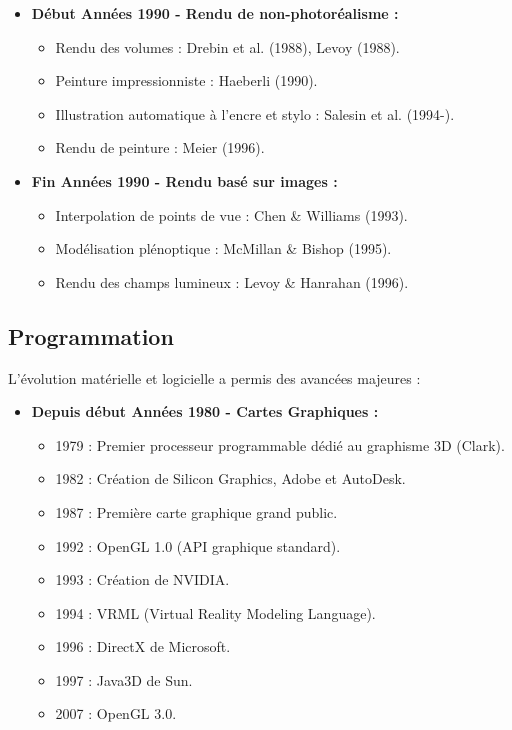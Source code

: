 \documentclass{article}
\begin{document}
\begin{itemize}
    \item \textbf{Début Années 1990 - Rendu de non-photoréalisme :}
    \begin{itemize}
        \item Rendu des volumes : Drebin et al. (1988), Levoy (1988).
        \item Peinture impressionniste : Haeberli (1990).
        \item Illustration automatique à l'encre et stylo : Salesin et al. (1994-).
        \item Rendu de peinture : Meier (1996).
    \end{itemize}
    \item \textbf{Fin Années 1990 - Rendu basé sur images :}
    \begin{itemize}
        \item Interpolation de points de vue : Chen \& Williams (1993).
        \item Modélisation plénoptique : McMillan \& Bishop (1995).
        \item Rendu des champs lumineux : Levoy \& Hanrahan (1996).
    \end{itemize}
\end{itemize}
\subsection{Programmation}
L'évolution matérielle et logicielle a permis des avancées majeures :
\begin{itemize}
    \item \textbf{Depuis début Années 1980 - Cartes Graphiques :}
    \begin{itemize}
        \item 1979 : Premier processeur programmable dédié au graphisme 3D (Clark).
        \item 1982 : Création de Silicon Graphics, Adobe et AutoDesk.
        \item 1987 : Première carte graphique grand public.
        \item 1992 : OpenGL 1.0 (API graphique standard).
        \item 1993 : Création de NVIDIA.
        \item 1994 : VRML (Virtual Reality Modeling Language).
        \item 1996 : DirectX de Microsoft.
        \item 1997 : Java3D de Sun.
        \item 2007 : OpenGL 3.0.
    \end{itemize}
\end{itemize}
\end{document}

